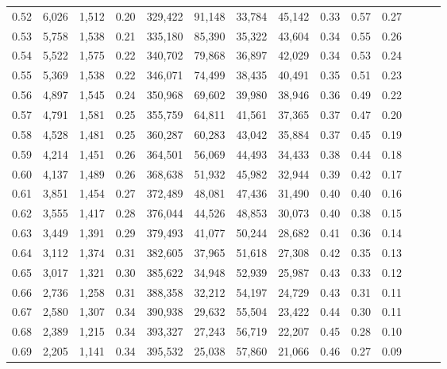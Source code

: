 \begin{tabular}{rrrrrrrrrrrrrr}
0.52 &   6,026 &  1,512 &  0.20 &  329,422 &   91,148 &  33,784 &  45,142 &  0.33 &  0.57 &      0.27 \\
0.53 &   5,758 &  1,538 &  0.21 &  335,180 &   85,390 &  35,322 &  43,604 &  0.34 &  0.55 &      0.26 \\
0.54 &   5,522 &  1,575 &  0.22 &  340,702 &   79,868 &  36,897 &  42,029 &  0.34 &  0.53 &      0.24 \\
0.55 &   5,369 &  1,538 &  0.22 &  346,071 &   74,499 &  38,435 &  40,491 &  0.35 &  0.51 &      0.23 \\
0.56 &   4,897 &  1,545 &  0.24 &  350,968 &   69,602 &  39,980 &  38,946 &  0.36 &  0.49 &      0.22 \\
0.57 &   4,791 &  1,581 &  0.25 &  355,759 &   64,811 &  41,561 &  37,365 &  0.37 &  0.47 &      0.20 \\
0.58 &   4,528 &  1,481 &  0.25 &  360,287 &   60,283 &  43,042 &  35,884 &  0.37 &  0.45 &      0.19 \\
0.59 &   4,214 &  1,451 &  0.26 &  364,501 &   56,069 &  44,493 &  34,433 &  0.38 &  0.44 &      0.18 \\
0.60 &   4,137 &  1,489 &  0.26 &  368,638 &   51,932 &  45,982 &  32,944 &  0.39 &  0.42 &      0.17 \\
0.61 &   3,851 &  1,454 &  0.27 &  372,489 &   48,081 &  47,436 &  31,490 &  0.40 &  0.40 &      0.16 \\
0.62 &   3,555 &  1,417 &  0.28 &  376,044 &   44,526 &  48,853 &  30,073 &  0.40 &  0.38 &      0.15 \\
0.63 &   3,449 &  1,391 &  0.29 &  379,493 &   41,077 &  50,244 &  28,682 &  0.41 &  0.36 &      0.14 \\
0.64 &   3,112 &  1,374 &  0.31 &  382,605 &   37,965 &  51,618 &  27,308 &  0.42 &  0.35 &      0.13 \\
0.65 &   3,017 &  1,321 &  0.30 &  385,622 &   34,948 &  52,939 &  25,987 &  0.43 &  0.33 &      0.12 \\
0.66 &   2,736 &  1,258 &  0.31 &  388,358 &   32,212 &  54,197 &  24,729 &  0.43 &  0.31 &      0.11 \\
0.67 &   2,580 &  1,307 &  0.34 &  390,938 &   29,632 &  55,504 &  23,422 &  0.44 &  0.30 &      0.11 \\
0.68 &   2,389 &  1,215 &  0.34 &  393,327 &   27,243 &  56,719 &  22,207 &  0.45 &  0.28 &      0.10 \\
0.69 &   2,205 &  1,141 &  0.34 &  395,532 &   25,038 &  57,860 &  21,066 &  0.46 &  0.27 &      0.09 \\

\end{tabular}
